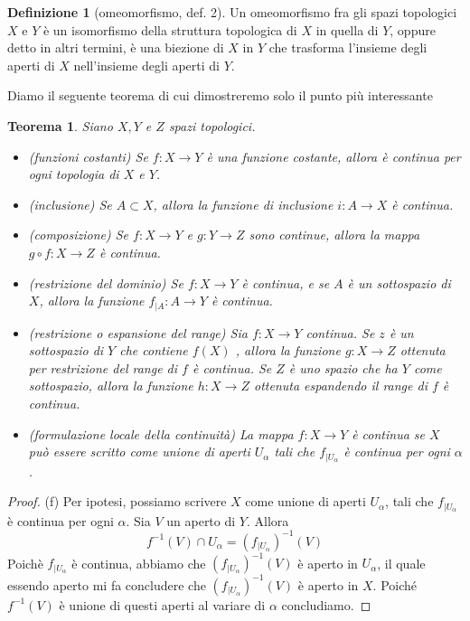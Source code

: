 \documentclass[10pt,a4paper]{article}
\theoremstyle{definition}
\newtheorem{defi}{Definizione}
\theoremstyle{plain}
\newtheorem{teo}{Teorema}
\theoremstyle{remark}
\theoremstyle{remark}
\begin{document}
\begin{defi}[omeomorfismo, def. 2] Un omeomorfismo fra gli spazi topologici $X$
e $Y$ è un isomorfismo della struttura topologica di $X$ in quella di $Y$,
oppure detto in altri termini, è una biezione di $X$ in $Y$ che trasforma
l'insieme degli aperti di $X$ nell'insieme degli aperti di $Y$.
\end{defi}

Diamo il seguente teorema di cui dimostreremo solo il punto più interessante


\begin{teo} Siano $X,Y$ e $Z$ spazi topologici.
\begin{itemize}
\item[(a) ] (funzioni costanti) Se $f : X \to Y$ è una funzione costante, allora
è continua per ogni topologia di $X$ e $Y$.
\item[(b) ] (inclusione) Se $A \subset X$, allora la funzione di inclusione $i :
A \to X$ è continua.
\item[(c) ] (composizione) Se $f: X \to Y$ e $g: Y \to Z$ sono continue, allora
la mappa $g \circ f : X \to Z$ è continua.
\item[(d) ] (restrizione del dominio) Se $f: X \to Y$ è continua, e se $A$ è un
sottospazio di $X$, allora la funzione $f_{|A} : A \to Y$ è continua.
\item[(e) ] (restrizione o espansione del range) Sia $f: X \to Y$ continua. Se
$z$ è un sottospazio di $Y$ che contiene $f(X)$ , allora la funzione $g: X \to
Z$ ottenuta per restrizione del range di $f$ è continua. Se $Z$ è uno spazio che
ha $Y$ come sottospazio, allora la funzione $h : X \to Z$ ottenuta espandendo il
range di $f$ è continua.
\item[(f) ] (formulazione locale della continuità) La mappa $f: X \to Y$ è
continua se $X$ può essere scritto come unione di aperti $U_{\alpha}$ tali che
$f_{|U_{\alpha}}$ è continua per ogni $\alpha$.

\end{itemize}

\end{teo}
\begin{proof} (f) Per ipotesi, possiamo scrivere $X$ come unione di aperti
$U_{\alpha}$, tali che $f_{|U_{\alpha}}$ è continua per ogni $\alpha$. Sia $V$
un aperto di $Y$. Allora \[ f^{-1}(V) \cap U_{\alpha} =
\left(f_{|U_{\alpha}}\right)^{-1}(V) \] Poichè $f_{|U_{\alpha}}$ è continua,
abbiamo che $\left(f_{|U_{\alpha}}\right)^{-1}(V)$ è aperto in $U_{\alpha}$, il
quale essendo aperto mi fa concludere che $\left(f_{|U_{\alpha}}\right)^{-1}(V)$
è aperto in $X$. Poiché $f^{-1}(V)$ è unione di questi aperti al variare di
$\alpha$ concludiamo.

\end{proof}
\end{document}
